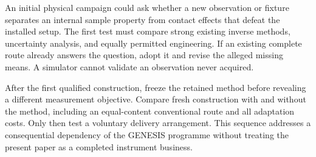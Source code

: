 An initial physical campaign could ask whether a new observation or fixture separates an internal sample property from contact effects that defeat the installed setup. The first test must compare strong existing inverse methods, uncertainty analysis, and equally permitted engineering. If an existing complete route already answers the question, adopt it and revise the alleged missing means. A simulator cannot validate an observation never acquired.

After the first qualified construction, freeze the retained method before revealing a different measurement objective. Compare fresh construction with and without the method, including an equal-content conventional route and all adaptation costs. Only then test a voluntary delivery arrangement. This sequence addresses a consequential dependency of the GENESIS programme without treating the present paper as a completed instrument business.
